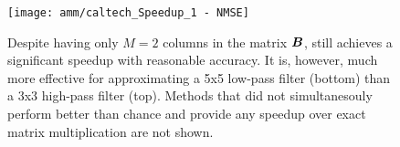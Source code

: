 

\begin{figure}[h]
\begin{center}
\texttt{[image: amm/caltech\_Speedup\_1 - NMSE]}
\caption{Despite having only $M=2$ columns in the matrix $\bm{B}$, \oursp still achieves a significant speedup with reasonable accuracy. It is, however, much more effective for approximating a 5x5 low-pass filter (bottom) than a 3x3 high-pass filter (top). Methods that did not simultanesouly perform better than chance and provide any speedup over exact matrix multiplication are not shown.}
\label{fig:caltech}
\end{center}
\end{figure}


